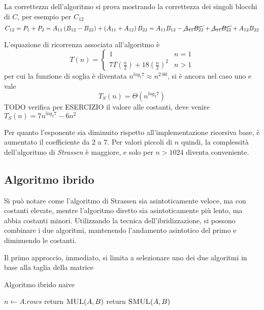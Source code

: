 La correttezza dell'algoritmo si prova mostrando la correttezza dei singoli blocchi di $C$, per esempio per $C_{12}$
\begin{equation*}
    C_{12} = P_1+P_2 = A_{11} \left( B_{12}-B_{22} \right) + \left( A_{11}+A_{12} \right) B_{22} =
    A_{11}B_{12} - \cancel{A_{11}B_{22}} + \cancel{A_{11}B_{22}} + A_{12}B_{22}
\end{equation*}

L'equazione di ricorrenza associata all'algoritmo è
\begin{equation}
    T(n) = 
    \begin{cases}
        1 & n=1 \\
        7 T \left( \frac{n}{2} \right) + 18 \left( \frac{n}{2} \right)^2 & n>1
    \end{cases}
    \label{eq:ricstrassen}
\end{equation}
per cui la funzione di soglia è diventata $n^{log_2 7} \approx n^{2.80}$, si è ancora nel caso uno e vale
\begin{equation*}
    T_S(n) = \Theta \left( n^{log_2 7} \right)
\end{equation*}
TODO verifica per ESERCIZIO il valore alle costanti, deve venire $T_S(n)=7n^{log_2 7}-6n^2$

Per quanto l'esponente sia diminuito rispetto all'implementazione ricorsiva base, è aumentato il coefficiente da $2$ a $7$. Per valori piccoli di $n$ quindi, la complessità dell'algoritmo di \textit{Strassen} è maggiore, e solo per $n>1024$ diventa conveniente.

\subsection{Algoritmo ibrido}
Si può notare come l'algoritmo di Strassen sia asintoticamente veloce, ma con costanti elevate, mentre l'algoritmo diretto sia asintoticamente più lento, ma abbia costanti minori. Utilizzando la tecnica dell'ibridizzazione, si possono combinare i due algoritmi, mantenendo l'andamento asintotico del primo e diminuendo le costanti.

Il primo approccio, immediato, si limita a selezionare uno dei due algoritmi in base alla taglia della matrice


\begin{algorithm}[H]
    \caption{Algoritmo ibrido naive}\label{alg:mulrcnaive}
\begin{algorithmic}[1]
    \State $n \gets A.rows$
        \State return $\Call{MUL}{A,B}$
        \Else
        \State return $\Call{SMUL}{A,B}$
    \EndIf
    \EndProcedure
\end{algorithmic}
\end{algorithm}

